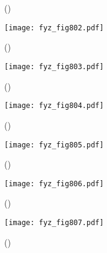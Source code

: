     \begin{figure}[ht!]
      \centering
                     \\
                     \\
      \caption{
               (\cite[s.~748]{Feynman02})}
      \label{fyz:fig801}
    \end{figure}

    \begin{figure}[ht!] %
      \centering
      \texttt{[image: fyz\_fig802.pdf]}
      \caption{
               (\cite[s.~707]{Feynman02})}
      \label{fyz:fig802}
    \end{figure}
    
    \begin{figure}[ht!] %
      \centering
      \texttt{[image: fyz\_fig803.pdf]}
      \caption{
               (\cite[s.~707]{Feynman02})}
      \label{fyz:fig803}
    \end{figure}

    \begin{figure}[ht!] %
      \centering
      \texttt{[image: fyz\_fig804.pdf]}
      \caption{
               (\cite[s.~707]{Feynman02})}
      \label{fyz:fig804}
    \end{figure}
    
    \begin{figure}[ht!] %
      \centering
      \texttt{[image: fyz\_fig805.pdf]}
      \caption{
               (\cite[s.~707]{Feynman02})}
      \label{fyz:fig805}
    \end{figure}


    \begin{figure}[ht!] %
      \centering
      \texttt{[image: fyz\_fig806.pdf]}
      \caption{
               (\cite[s.~707]{Feynman02})}
      \label{fyz:fig806}
    \end{figure}

    \begin{figure}[ht!] %
      \centering
      \texttt{[image: fyz\_fig807.pdf]}
      \caption{
               (\cite[s.~707]{Feynman02})}
      \label{fyz:fig807}
    \end{figure}
    
